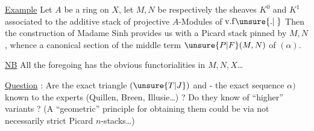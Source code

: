 
\uline{Example} Let $A$ be a ring on $X$, let $M,N$ be respectively the sheaves $K^{0}$ and $K^{1}$ associated to the additive stack of projective $A$-Modules of $\mathrm{v}.\mathrm{f}\unsure{.|\phantom{.}}$  Then the construction of Madame Sinh provides us with a Picard stack pinned by $M,N$, whence a canonical section  of the middle term $\unsure{P|F}(M,N)$ of $(\alpha)$.

\uline{NB} All the foregoing has the obvious functorialities in $M,N,X$\ldots

\uline{Question} : Are the exact triangle $(\unsure{T|J})$ and - the exact sequence $\alpha)$ known to the experts (Quillen, Breen, Illusie\ldots) ? Do they know of ``higher'' variants ? (A ``geometric'' principle for obtaining them could be via not necessarily strict Picard $n$-stacks\ldots)
